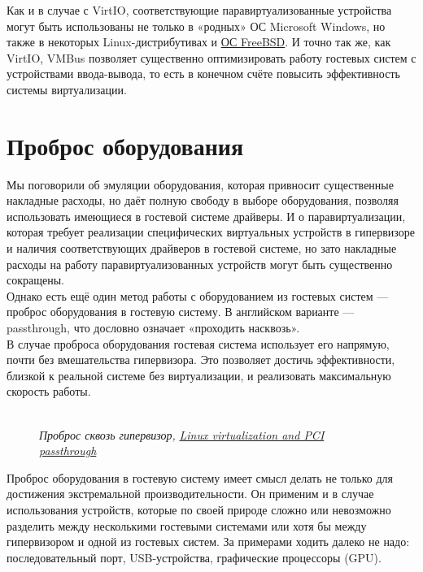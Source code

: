 \documentclass[14pt, a4paper]{article}
\begin{document}
Как и в случае с VirtIO, соответствующие паравиртуализованные устройства могут быть использованы
не только в «родных» ОС Microsoft Windows, но также в некоторых Linux-дистрибутивах и 
\href{https://docs.microsoft.com/ru-ru/windows-server/virtualization/hyper-v/supported-linux-and-freebsd-virtual-machines-for-hyper-v-on-windows}{ОС FreeBSD}. 
И точно так же, как VirtIO, VMBus позволяет существенно оптимизировать работу гостевых
систем с устройствами ввода-вывода, то есть в конечном счёте повысить эффективность системы
виртуализации.

\section*{Проброс оборудования} 

Мы поговорили об эмуляции оборудования, которая привносит существенные накладные расходы, но
даёт полную свободу в выборе оборудования, позволяя использовать имеющиеся в гостевой системе
драйверы. И о паравиртуализации, которая требует реализации специфических виртуальных
устройств в гипервизоре и наличия соответствующих драйверов в гостевой системе, но зато
накладные расходы на работу паравиртуализованных устройств могут быть существенно сокращены.\\

Однако есть ещё один метод работы с оборудованием из гостевых систем — проброс оборудования в
гостевую систему. В английском варианте — passthrough, что дословно означает «проходить
насквозь».\\

В случае проброса оборудования гостевая система использует его напрямую, почти без
вмешательства гипервизора. Это позволяет достичь эффективности, близкой к реальной системе без
виртуализации, и реализовать максимальную скорость работы.

\begin{figure}[h]
    \centering
    \\ 
    \small\textit{Проброс сквозь гипервизор,} \href{https://developer.ibm.com/tutorials/l-pci-passthrough/}{\small\textit{Linux virtualization and PCI passthrough}} 
    \label{framework} 
\end{figure}

Проброс оборудования в гостевую систему имеет смысл делать не только для достижения
экстремальной производительности. Он применим и в случае использования устройств, которые по
своей природе сложно или невозможно разделить между несколькими гостевыми системами или хотя
бы между гипервизором и одной из гостевых систем. За примерами ходить далеко не надо:
последовательный порт, USB-устройства, графические процессоры (GPU).\\
\end{document}

